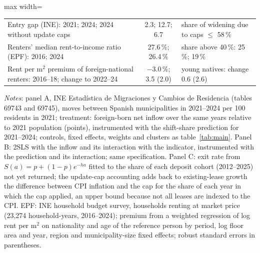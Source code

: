 \begin{table}[!htbp]
\begin{adjustbox}{max width=\linewidth}
\begin{tabular}{lccccc}
Entry gap (INE): 2021; 2024; 2024 without update caps & \multicolumn{2}{c}{2.3; 12.7; 6.7} & \multicolumn{3}{l}{share of widening due to caps $\le$ 58\,\%}\\
Renters' median rent-to-income ratio (EPF): 2016; 2024 & \multicolumn{2}{c}{27.6\,\%; 26.4\,\%} & \multicolumn{3}{l}{share above 40\,\%: 25\,\%; 19\,\%}\\
Rent per m$^2$ premium of foreign-national renters: 2016--18; change to 2022--24 & \multicolumn{2}{c}{$-$3.0\,\%; 3.5 (2.0)} & \multicolumn{3}{l}{young natives: change 0.6 (2.6)}\\
\bottomrule\end{tabular}\end{adjustbox}
\begin{minipage}{0.97\linewidth}\footnotesize\vspace{4pt}
\textit{Notes}: panel A, INE Estadística de Migraciones y Cambios de Residencia (tables 69743 and 69745), moves between Spanish municipalities in 2021--2024 per 100 residents in 2021; treatment: foreign-born net inflow over the same years relative to 2021 population (points), instrumented with the shift-share prediction for 2021--2024; controls, fixed effects, weights and clusters as table~\ref{tab:main}. Panel B: 2SLS with the inflow and its interaction with the indicator, instrumented with the prediction and its interaction; same specification. Panel C: exit rate from $S(a)=p+(1-p)e^{-ha}$ fitted to the share of each deposit cohort (2012--2025) not yet returned; the update-cap accounting adds back to existing-lease growth the difference between CPI inflation and the cap for the share of each year in which the cap applied, an upper bound because not all leases are indexed to the CPI. EPF: INE household budget survey, households renting at market price (23,274 household-years, 2016--2024); premium from a weighted regression of log rent per m$^2$ on nationality and age of the reference person by period, log floor area and year, region and municipality-size fixed effects; robust standard errors in parentheses.
\end{minipage}\end{table}